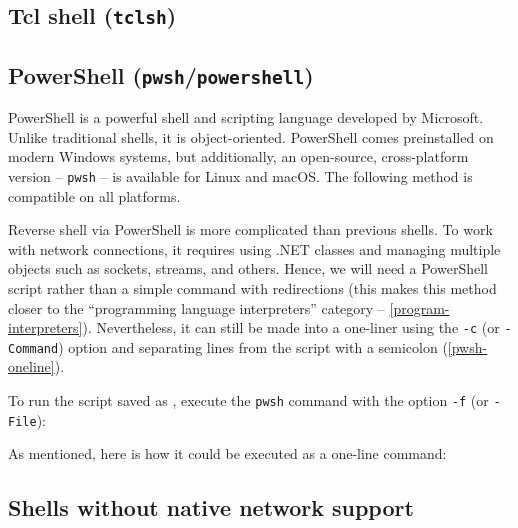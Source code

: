 
\subsection{Tcl shell (\texttt{tclsh})}

\TODO{}


\subsection{PowerShell (\texttt{pwsh}/\texttt{powershell})}


PowerShell is a powerful shell and scripting language developed by Microsoft. Unlike traditional shells, it is object-oriented. PowerShell comes preinstalled on modern Windows systems, but additionally, an open-source, cross-platform version -- \texttt{pwsh} -- is available for Linux and macOS. The following method is compatible on all platforms.

Reverse shell via PowerShell is more complicated than previous shells. To work with network connections, it requires using .NET classes and managing multiple objects such as sockets, streams, and others. Hence, we will need a PowerShell script rather than a simple command with redirections (this makes this method closer to the ``programming language interpreters'' category -- \cref{program-interpreters}). Nevertheless, it can still be made into a one-liner using the \texttt{-c} (or \texttt{-Command}) option and separating lines from the script with a semicolon (\cref{pwsh-oneline}).



To run the script saved as \scriptfile , execute the \texttt{pwsh} command with the option \texttt{-f} (or \texttt{-File}):


As mentioned, here is how it could be executed as a one-line command:



\subsection{Shells without native network support}
\label{no-network-shells}


